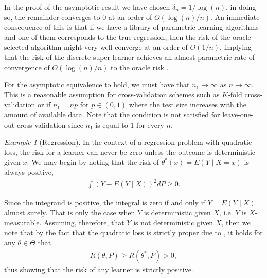 \documentclass[11pt, a4paper]{article}
\theoremstyle{definition}
\theoremstyle{remark}
\newtheorem{example}{Example}
\begin{document}
In the proof of the asymptotic result we have chosen $ \delta_n = 1/\log(n) $, in doing so, the remainder converges to $ 0 $ at an order of $ O(\log(n)/n) $. An immediate consequence of this is that if we have a library of parametric learning algorithms and one of them corresponds to the true regression, then the risk of the oracle selected algorithm might very well converge at an order of $ O(1/n) $, implying that the risk of the discrete super learner achieves an almost parametric rate of convergence of $ O(\log(n)/n) $ to the oracle risk \parencite{van2007super}.  

For the asymptotic equivalence to hold, we must have that $ n_1 \to \infty $ as $ n \to \infty $. This is a reasonable assumption for cross-validation schemes such as $ K $-fold cross-validation or if $ n_1 = np $ for $ p \in (0,1) $ where the test size increases with the amount of available data. Note that the condition is not satisfied for leave-one-out cross-validation since $ n_1$ is equal to $ 1 $ for every $ n $.  

\begin{example}[Regression]
   In the context of a regression problem with quadratic loss, the risk for a learner can never be zero unless the outcome is deterministic given $ x $. We may begin by noting that the risk of $ \theta^*(x) = E(Y \mid X = x) $ is always positive,
   \begin{align*}
       \int (Y - E(Y \mid X))^2 d P \geq 0. 
   \end{align*}

   Since the integrand is positive, the integral is zero if and only if $ Y = E(Y \mid X) $ almost surely. That is only the case when $ Y $ is deterministic given $ X $, i.e. $ Y $ is $ X $-measurable. Assuming, therefore, that $ Y $ is not deterministic given $ X $, then we note that by the fact that the quadratic loss is strictly proper due to , it holds for any $ \theta \in \Theta $ that
   \begin{align*}
       R(\theta, P) \geq R(\theta^*, P) > 0,
   \end{align*}
    thus showing that the risk of any learner is strictly positive.
\end{example}
\end{document}
